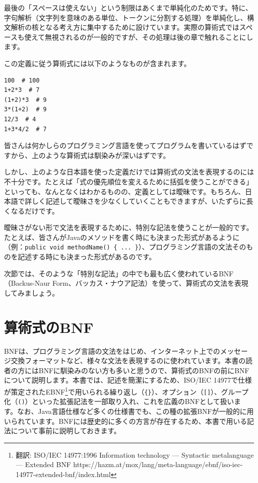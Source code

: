 最後の「スペースは使えない」という制限はあくまで単純化のためです。特に、字句解析（文字列を意味のある単位、トークンに分割する処理）を単純化し、構文解析の核となる考え方に集中するために設けています。実際の算術式ではスペースも使えて無視されるのが一般的ですが、その処理は後の章で触れることにします。

この定義に従う算術式には以下のようなものが含まれます。

\begin{verbatim}
100  # 100
1+2*3  # 7
(1+2)*3  # 9
3*(1+2)  # 9
12/3  # 4
1+3*4/2  # 7
\end{verbatim}

皆さんは何かしらのプログラミング言語を使ってプログラムを書いているはずですから、上のような算術式は馴染みが深いはずです。

しかし、上のような日本語を使った定義だけでは算術式の文法を表現するのには不十分です。たとえば「式の優先順位を変えるために括弧を使うことができる」といっても、なんとなくはわかるものの、定義としては曖昧です。もちろん、日本語で詳しく記述して曖昧さを少なくしていくこともできますが、いたずらに長くなるだけです。

曖昧さがない形で文法を表現するために、特別な記法を使うことが一般的です。たとえば、皆さんがJavaのメソッドを書く時にも決まった形式があるように（例：\texttt{public\ void\ methodName()\ \{\ ...\ \}}）、プログラミング言語の文法そのものを記述する時にも決まった形式があるのです。

次節では、そのような「特別な記法」の中でも最も広く使われているBNF（Backus-Naur
Form、バッカス・ナウア記法）を使って、算術式の文法を表現してみましょう。

\hypertarget{chapter2-ux7b97ux8853ux5f0fux306ebnf}{%
\section{算術式のBNF}\label{chapter2-ux7b97ux8853ux5f0fux306ebnf}}

BNFは、プログラミング言語の文法をはじめ、インターネット上でのメッセージ交換フォーマットなど、様々な文法を表現するのに使われています。本書の読者の方にはBNFに馴染みのない方も多いと思うので、算術式のBNFの前にBNFについて説明します。本書では、記述を簡潔にするため、ISO/IEC
14977で仕様が策定されたEBNF\footnote{翻訳: ISO/IEC 14977:1996
  Information technology --- Syntactic metalanguage --- Extended BNF
  https://hazm.at/mox/lang/meta-language/ebnf/iso-iec-14977-extended-bnf/index.html}で用いられる繰り返し（\texttt{\{\}}）、オプション（\texttt{{[}{]}}）、グループ化（\texttt{()}）といった拡張記法を一部取り入れ、これを広義のBNFとして扱います。なお、Java言語仕様など多くの仕様書でも、この種の拡張BNFが一般的に用いられています。BNFには歴史的に多くの方言が存在するため、本書で用いる記法について事前に説明しておきます。

